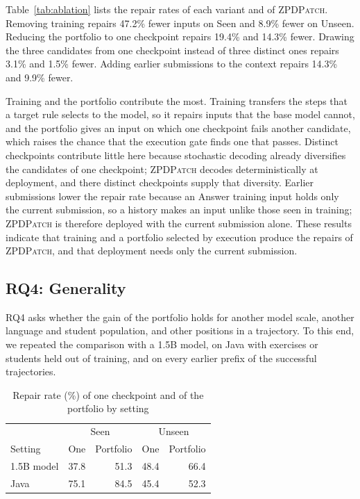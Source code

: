 \documentclass[10pt,conference]{IEEEtran}
\begin{document}
Table~\ref{tab:ablation} lists the repair rates of each variant and of \textsc{ZPDPatch}. Removing training repairs 47.2\% fewer inputs on Seen and 8.9\% fewer on Unseen. Reducing the portfolio to one checkpoint repairs 19.4\% and 14.3\% fewer. Drawing the three candidates from one checkpoint instead of three distinct ones repairs 3.1\% and 1.5\% fewer. Adding earlier submissions to the context repairs 14.3\% and 9.9\% fewer.

Training and the portfolio contribute the most. Training transfers the steps that a target rule selects to the model, so it repairs inputs that the base model cannot, and the portfolio gives an input on which one checkpoint fails another candidate, which raises the chance that the execution gate finds one that passes. Distinct checkpoints contribute little here because stochastic decoding already diversifies the candidates of one checkpoint; \textsc{ZPDPatch} decodes deterministically at deployment, and there distinct checkpoints supply that diversity. Earlier submissions lower the repair rate because an Answer training input holds only the current submission, so a history makes an input unlike those seen in training; \textsc{ZPDPatch} is therefore deployed with the current submission alone. These results indicate that training and a portfolio selected by execution produce the repairs of \textsc{ZPDPatch}, and that deployment needs only the current submission.

\subsection{RQ4: Generality}

\label{sec:generality}
RQ4 asks whether the gain of the portfolio holds for another model scale, another language and student population, and other positions in a trajectory. To this end, we repeated the comparison with a 1.5B model, on Java with exercises or students held out of training, and on every earlier prefix of the successful trajectories.

\begin{table}[h]
\caption{Repair rate (\%) of one checkpoint and of the portfolio by setting}
\label{tab:generality}
\centering\scriptsize
\begin{tabular}{l||rr|rr}
\toprule
 & \multicolumn{2}{c|}{Seen} & \multicolumn{2}{c}{Unseen} \\
Setting & One & Portfolio & One & Portfolio \\
\midrule
1.5B model & 37.8 & 51.3 & 48.4 & 66.4 \\
Java & 75.1 & 84.5 & 45.4 & 52.3 \\
\bottomrule
\end{tabular}
\end{table}
\end{document}

